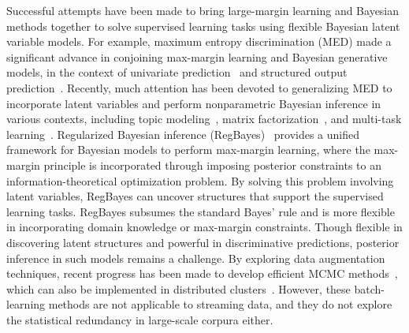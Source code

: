 \documentclass[twoside,11pt]{article}
\begin{document}
Successful attempts have been made to bring large-margin learning and Bayesian methods together to solve supervised learning tasks using flexible Bayesian latent variable models. For example, maximum entropy discrimination (MED) made a significant advance in conjoining max-margin learning and Bayesian generative models, in the context of univariate prediction~\citep{jaakkola1999maximum} and structured output prediction~\citep{Zhu:jmlr09}. Recently, much attention has been devoted to generalizing MED to incorporate latent variables and perform nonparametric Bayesian inference in various contexts, including topic modeling~\citep{zhu2012medlda}, matrix factorization~\citep{xu2013fast}, and multi-task learning~\citep{jebara2011mtl,zhu2013bayesian}. Regularized Bayesian inference (RegBayes)~\citep{zhu2013bayesian} provides a unified framework for Bayesian models to perform max-margin learning, where the max-margin principle is incorporated through imposing posterior constraints to an information-theoretical optimization problem. By solving this problem involving latent variables, RegBayes can uncover structures that support the supervised learning tasks. RegBayes subsumes the standard Bayes' rule and is more flexible in incorporating domain knowledge or max-margin constraints. Though flexible in discovering latent structures and powerful in discriminative predictions, posterior inference in such models remains a challenge. By exploring data augmentation techniques, recent progress has been made to develop efficient MCMC methods~\citep{zhugibbs2013}, which can also be implemented in distributed clusters~\citep{zhu2013scalable}. However, these batch-learning methods are not applicable to streaming data, and they do not explore the statistical redundancy in large-scale corpura either. %
\end{document}
